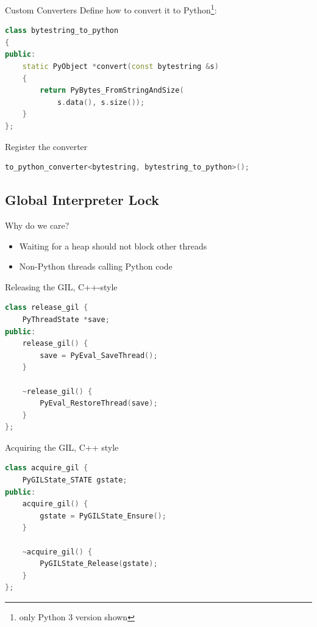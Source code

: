 \documentclass{beamer}
\begin{document}
\begin{frame}[fragile=singleslide]{Custom Converters}
  Define how to convert it to Python\footnote{only Python 3 version shown}:
  \begin{lstlisting}[language=c++]
class bytestring_to_python
{
public:
    static PyObject *convert(const bytestring &s)
    {
        return PyBytes_FromStringAndSize(
            s.data(), s.size());
    }
};
  \end{lstlisting}

  Register the converter
  \begin{lstlisting}[language=c++]
to_python_converter<bytestring, bytestring_to_python>();
  \end{lstlisting}
\end{frame}

\subsection[GIL]{Global Interpreter Lock}

\begin{frame}{Why do we care?}
  \begin{itemize}
    \item Waiting for a heap should not block other threads
    \item Non-Python threads calling Python code
  \end{itemize}
\end{frame}

\begin{frame}[fragile=singleslide]{Releasing the GIL, C++-style}
  \begin{lstlisting}[language=c++]
class release_gil {
    PyThreadState *save;
public:
    release_gil() {
        save = PyEval_SaveThread();
    }

    ~release_gil() {
        PyEval_RestoreThread(save);
    }
};
  \end{lstlisting}
\end{frame}

\begin{frame}[fragile=singleslide]{Acquiring the GIL, C++ style}
  \begin{lstlisting}[language=c++]
class acquire_gil {
    PyGILState_STATE gstate;
public:
    acquire_gil() {
        gstate = PyGILState_Ensure();
    }

    ~acquire_gil() {
        PyGILState_Release(gstate);
    }
};
  \end{lstlisting}
\end{frame}
\end{document}
